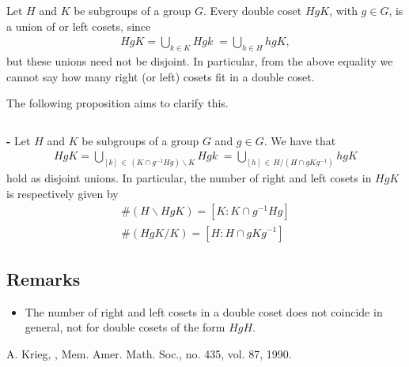 \documentclass[12pt]{article}
\begin{document}

Let $H$ and $K$ be subgroups of a group $G$. Every double coset $HgK$, with $g \in G$, is a union of  or left cosets, since
\begin{align*}
HgK = \bigcup_{k \in K} Hgk\; = \bigcup_{h \in H} hgK,
\end{align*}
but these unions need not be disjoint. In particular, from the above equality we cannot say how many right (or left) cosets fit in a double coset.

The following proposition aims to clarify this.

$\,$

{\bf {} -} Let $H$ and $K$ be subgroups of a group $G$ and $g \in G$. We have that
\begin{align*}
HgK = \bigcup_{[k]\, \in\, (K \cap g^{-1}Hg) \backslash K} Hgk\; = \bigcup_{[h]\, \in\, H / (H \cap gKg^{-1})} hgK
\end{align*}
hold as disjoint unions. In particular, the number of right and left cosets in $HgK$ is respectively given by
\begin{align*}
\#(H \backslash HgK) = [K: K \cap g^{-1}Hg]\\
\#(HgK/K) =[H: H \cap gKg^{-1}]
\end{align*}

\subsection{Remarks}

\begin{itemize}
\item The number of right and left cosets in a double coset does not coincide in general, not  for double cosets of the form $HgH$.
\end{itemize}

\begin{thebibliography}{9}
 A. Krieg, \emph{}, Mem. Amer. Math. Soc., no. 435, vol. 87, 1990.
\end{thebibliography}
\end{document}
